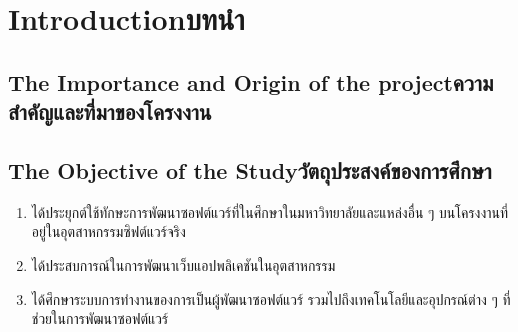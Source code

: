 \chapter{\ifenglish Introduction\else บทนำ\fi}

\section{\ifenglish The Importance and Origin of the 
project\else ความสำคัญและที่มาของโครงงาน\fi}

\section{\ifenglish The Objective of the Study\else วัตถุประสงค์ของการศึกษา\fi}
\begin{enumerate}
    \item ได้ประยุกต์ใช้ทักษะการพัฒนาซอฟต์แวร์ที่ในศึกษาในมหาวิทยาลัยและแหล่งอื่น ๆ บนโครงงานที่อยู่ในอุตสาหกรรมซิฟต์แวร์จริง
    \item ได้ประสบการณ์ในการพัฒนาเว็บแอปพลิเคชันในอุตสาหกรรม
    \item ได้ศึกษาระบบการทำงานของการเป็นผู้พัฒนาซอฟต์แวร์ รวมไปถึงเทคโนโลยีและอุปกรณ์ต่าง ๆ ที่ช่วยในการพัฒนาซอฟต์แวร์
\end{enumerate}